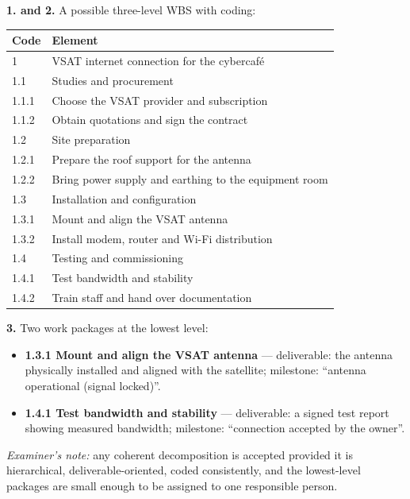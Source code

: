 \documentclass[11pt]{article}
\begin{document}
\begin{corrige}
\textbf{1. and 2.} A possible three-level WBS with coding:

\begin{center}
\begin{tabularx}{\linewidth}{|l|X|}\hline
\rowcolor{popblueL} \textbf{Code} & \textbf{Element} \\ \hline
1 & VSAT internet connection for the cybercafé \\ \hline
1.1 & Studies and procurement \\ \hline
1.1.1 & Choose the VSAT provider and subscription \\ \hline
1.1.2 & Obtain quotations and sign the contract \\ \hline
1.2 & Site preparation \\ \hline
1.2.1 & Prepare the roof support for the antenna \\ \hline
1.2.2 & Bring power supply and earthing to the equipment room \\ \hline
1.3 & Installation and configuration \\ \hline
1.3.1 & Mount and align the VSAT antenna \\ \hline
1.3.2 & Install modem, router and Wi-Fi distribution \\ \hline
1.4 & Testing and commissioning \\ \hline
1.4.1 & Test bandwidth and stability \\ \hline
1.4.2 & Train staff and hand over documentation \\ \hline
\end{tabularx}
\end{center}

\textbf{3.} Two work packages at the lowest level:
\begin{itemize}
\item \textbf{1.3.1 Mount and align the VSAT antenna} --- deliverable: the antenna physically installed and aligned with the satellite; milestone: ``antenna operational (signal locked)''.
\item \textbf{1.4.1 Test bandwidth and stability} --- deliverable: a signed test report showing measured bandwidth; milestone: ``connection accepted by the owner''.
\end{itemize}
\emph{Examiner's note:} any coherent decomposition is accepted provided it is hierarchical, deliverable-oriented, coded consistently, and the lowest-level packages are small enough to be assigned to one responsible person.
\end{corrige}
\end{document}
